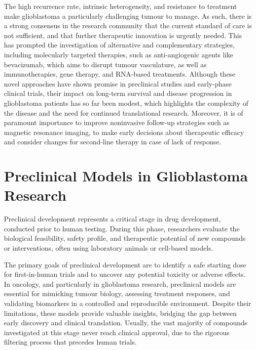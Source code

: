\documentclass[12pt, a4paper]{report}
\begin{document}
The high recurrence rate, intrinsic heterogeneity, and resistance to treatment make glioblastoma a particularly challenging tumour to manage. As such, there is a strong consensus in the research community that the current standard of care is not sufficient, and that further therapeutic innovation is urgently needed. This has prompted the investigation of alternative and complementary strategies, including molecularly targeted therapies, such as anti-angiogenic agents like bevacizumab, which aims to disrupt tumour vasculature, as well as immunotherapies, gene therapy, and RNA-based treatments. Although these novel approaches have shown promise in preclinical studies and early-phase clinical trials, their impact on long-term survival and disease progression in glioblastoma patients has so far been modest, which highlights the complexity of the disease and the need for continued translational research. Moreover, it is of paramount importance to improve noninvasive follow-up strategies such as magnetic resonance imaging, to make early decisions about therapeutic efficacy and consider changes for second-line therapy in case of lack of response. 

\section{Preclinical Models in Glioblastoma Research}

Preclinical development represents a critical stage in drug development, conducted prior to human testing. During this phase, researchers evaluate the biological feasibility, safety profile, and therapeutic potential of new compounds or interventions, often using laboratory animals or cell-based models. 

The primary goals of preclinical development are to identify a safe starting dose for first-in-human trials and to uncover any potential toxicity or adverse effects. In oncology, and particularly in glioblastoma research, preclinical models are essential for mimicking tumour biology, assessing treatment responses, and validating biomarkers in a controlled and reproducible environment. Despite their limitations, these models provide valuable insights, bridging the gap between early discovery and clinical translation. Usually, the vast majority of compounds investigated at this stage never reach clinical approval, due to the rigorous filtering process that precedes human trials.
\end{document}
